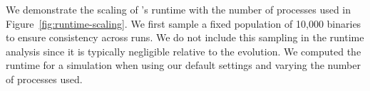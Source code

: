 \documentclass[twocolumn, twocolappendix, oneside]{aastex631}
\begin{document}


We demonstrate the scaling of \cogsworth's runtime with the number of processes used in Figure~\ref{fig:runtime-scaling}. We first sample a fixed population of 10,000 binaries to ensure consistency across runs. We do not include this sampling in the runtime analysis since it is typically negligible relative to the evolution. We computed the runtime for a \cogsworth simulation when using our default settings and varying the number of processes used.
\end{document}
